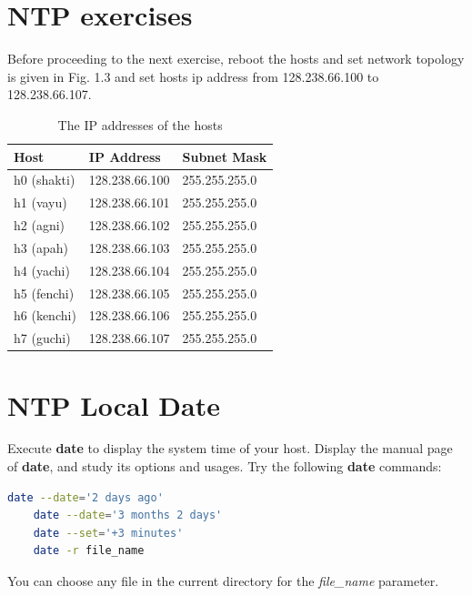 \documentclass{../UTNetLab}
\begin{document}
\section*{NTP exercises}
    Before proceeding to the next exercise, reboot the hosts and set network topology is given in Fig. 1.3 and set hosts ip address from 128.238.66.100 to 128.238.66.107.
    \begin{center}
        \begin{minipage}{0.48\textwidth}
            \begin{flushleft}
                \begin{table}[H]
                    \caption{The IP addresses of the hosts}
                    \vspace{5pt}
                    \centering
                    \large
                    \begin{tabular}{ l l l }
                        \hline \hline
                        Host & IP Address & Subnet Mask \\
                        \hline 
                        h0 (shakti) & 128.238.66.100 & 255.255.255.0 \\
                        h1 (vayu) & 128.238.66.101 & 255.255.255.0 \\
                        h2 (agni) & 128.238.66.102 & 255.255.255.0 \\
                        h3 (apah) & 128.238.66.103 & 255.255.255.0 \\
                        h4 (yachi) & 128.238.66.104 & 255.255.255.0 \\
                        h5 (fenchi) & 128.238.66.105 & 255.255.255.0 \\
                        h6 (kenchi) & 128.238.66.106 & 255.255.255.0 \\
                        h7 (guchi) & 128.238.66.107 & 255.255.255.0 \\
                        \hline \hline
                        \end{tabular}
                \end{table}
            \end{flushleft}
        \end{minipage}
    \end{center}

\section{NTP Local Date}
    Execute \textbf{date} to display the system time of your host. Display the manual page of \textbf{date}, and study its options and usages.
    Try the following \textbf{date} commands: \\
    \begin{lstlisting}[language=bash,
        basicstyle=\ttfamily,
        showstringspaces=false,
        commentstyle=\color{green},
        keywordstyle=\color{black}]
    date --date='2 days ago'
    date --date='3 months 2 days'
    date --set='+3 minutes'
    date -r file_name
    \end{lstlisting}
    You can choose any file in the current directory for the \textit{file\_name} parameter.
\end{document}
